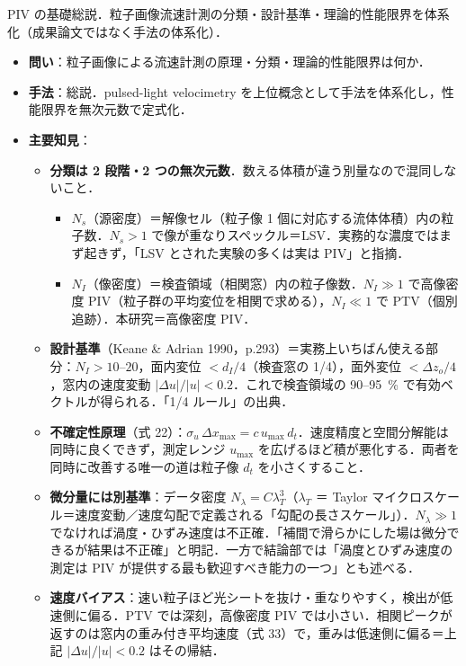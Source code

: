 \documentclass[11pt]{jsarticle}
\newcommand{\litref}[1]{{\large\bfseries\color{citecolor}#1}}
\begin{document}
\noindent\litref{Adrian (1991)}\quad PIV の基礎総説．粒子画像流速計測の分類・設計基準・理論的性能限界を体系化（成果論文ではなく手法の体系化）．
\begin{itemize}
  \item \textbf{問い}：粒子画像による流速計測の原理・分類・理論的性能限界は何か．
  \item \textbf{手法}：総説．pulsed-light velocimetry を上位概念として手法を体系化し，性能限界を無次元数で定式化．
  \item \textbf{主要知見}：
  \begin{itemize}
    \item \textbf{分類は 2 段階・2 つの無次元数}．数える体積が違う別量なので混同しないこと．
    \begin{itemize}
      \item $N_s$（源密度）＝解像セル（粒子像 1 個に対応する流体体積）内の粒子数．$N_s > 1$ で像が重なりスペックル＝LSV．実務的な濃度ではまず起きず，「LSV とされた実験の多くは実は PIV」と指摘．
      \item $N_I$（像密度）＝検査領域（相関窓）内の粒子像数．$N_I \gg 1$ で高像密度 PIV（粒子群の平均変位を相関で求める），$N_I \ll 1$ で PTV（個別追跡）．本研究＝高像密度 PIV．
    \end{itemize}
    \item \textbf{設計基準}（Keane \& Adrian 1990，p.293）＝実務上いちばん使える部分：$N_I > 10$--$20$，面内変位 $< d_I/4$（検査窓の 1/4），面外変位 $< \Delta z_o/4$，窓内の速度変動 $|\Delta u|/|u| < 0.2$．これで検査領域の 90--95~\% で有効ベクトルが得られる．「1/4 ルール」の出典．
    \item \textbf{不確定性原理}（式 22）：$\sigma_u \, \Delta x_\mathrm{max} = c \, u_\mathrm{max} \, d_t$．速度精度と空間分解能は同時に良くできず，測定レンジ $u_\mathrm{max}$ を広げるほど積が悪化する．両者を同時に改善する唯一の道は粒子像 $d_t$ を小さくすること．
    \item \textbf{微分量には別基準}：データ密度 $N_\lambda = C \lambda_T^3$（$\lambda_T$ ＝ Taylor マイクロスケール＝速度変動／速度勾配で定義される「勾配の長さスケール」）．$N_\lambda \gg 1$ でなければ渦度・ひずみ速度は不正確．「補間で滑らかにした場は微分できるが結果は不正確」と明記．一方で結論部では「渦度とひずみ速度の測定は PIV が提供する最も歓迎すべき能力の一つ」とも述べる．
    \item \textbf{速度バイアス}：速い粒子ほど光シートを抜け・重なりやすく，検出が低速側に偏る．PTV では深刻，高像密度 PIV では小さい．相関ピークが返すのは窓内の重み付き平均速度（式 33）で，重みは低速側に偏る＝上記 $|\Delta u|/|u| < 0.2$ はその帰結．

\end{itemize}
\end{itemize}
\end{document}
